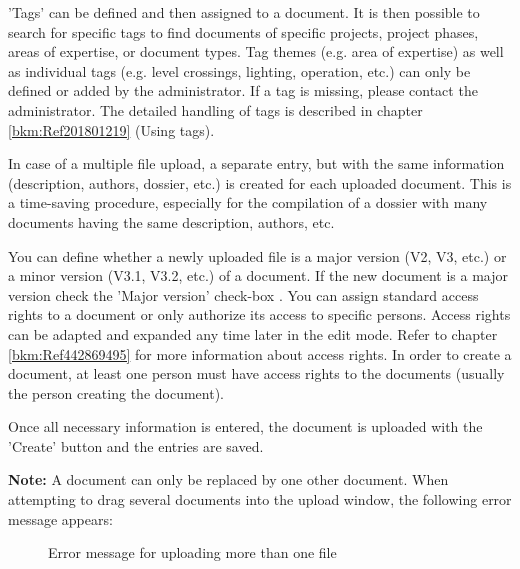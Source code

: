 'Tags'  can be defined and then assigned to a document. It is then possible to search for specific tags to find documents of specific projects, project phases, areas of expertise, or document types. Tag themes (e.g. area of expertise) as well as individual tags (e.g. level crossings, lighting, operation, etc.) can only be defined or added by the administrator. If a tag is missing, please contact the administrator. The detailed handling of tags is described in chapter \ref{bkm:Ref201801219} (Using tags). \newline

In case of a multiple file upload, a separate entry, but with the same information (description, authors, dossier, etc.) is created for each uploaded document. This is a time-saving procedure, especially for the compilation of a dossier with many documents having the same description, authors, etc. \newline


You can define whether a newly uploaded file is a major version (V2, V3, etc.) or a minor version (V3.1, V3.2, etc.) of a document. If the new document is a major version check the 'Major version' check-box . You can assign standard access rights to a document  or only authorize its access to specific persons. Access rights can be adapted and expanded any time later in the edit mode. Refer to chapter \ref{bkm:Ref442869495} for more information about access rights. In order to create a document, at least one person must have access rights to the documents (usually the person creating the document).

Once all necessary information is entered, the document is uploaded with the 'Create' button  and the entries are saved. \newline

\textbf{Note:} A document can only be replaced by one other document. When attempting to drag several documents into the upload window, the following error message appears:

\begin{figure}[H]
\caption{Error message for uploading more than one file}
\end{figure}

